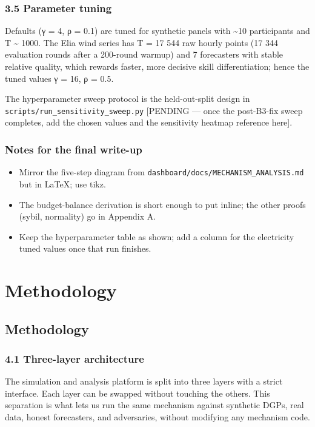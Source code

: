 \documentclass[11pt,a4paper,openany]{report}
\begin{document}
\section{3.5 Parameter tuning}

Defaults (γ = 4, ρ = 0.1) are tuned for synthetic panels with \textasciitilde{}10
participants and T \textasciitilde{} 1000. The Elia wind series has T = 17 544 raw
hourly points (17 344 evaluation rounds after a 200-round warmup) and
7 forecasters with stable relative quality, which rewards faster,
more decisive skill differentiation; hence the tuned values γ = 16,
ρ = 0.5.

The hyperparameter sweep protocol is the held-out-split design in
\texttt{scripts/run\_sensitivity\_sweep.py} [PENDING — once the post-B3-fix
sweep completes, add the chosen values and the sensitivity heatmap
reference here].

\section{Notes for the final write-up}

\begin{itemize}
  \item Mirror the five-step diagram from \texttt{dashboard/docs/MECHANISM\_ANALYSIS.md}
    but in LaTeX; use tikz.
  \item The budget-balance derivation is short enough to put inline; the
    other proofs (sybil, normality) go in Appendix A.
  \item Keep the hyperparameter table as shown; add a column for the
    electricity tuned values once that run finishes.
\end{itemize}

\part*{Methodology}
\chapter{Methodology}

\section{4.1 Three-layer architecture}

The simulation and analysis platform is split into three layers with
a strict interface. Each layer can be swapped without touching the
others. This separation is what lets us run the same mechanism against
synthetic DGPs, real data, honest forecasters, and adversaries, without
modifying any mechanism code.
\end{document}
